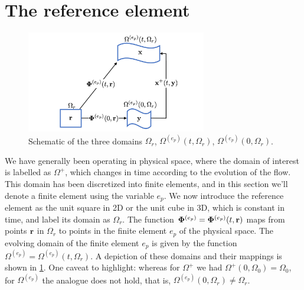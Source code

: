 \documentclass[11pt]{report}
\begin{document}
\section{The reference element}
\begin{figure}[ht]
    \centering
    \includegraphics[width=0.7\textwidth]{../../images/three_spaces.pdf}
    \caption{Schematic of the three domains $\Omega_r$, $\Omega^{(e_p)}(t,\Omega_r)$, $\Omega^{(e_p)}(0,\Omega_r)$.}
    \label{fig:three_spaces}
 \end{figure}
We have generally been operating in physical space, where the domain of interest is labelled as $\Omega^+$, which changes in time according to the evolution of the flow. This domain has been discretized into finite elements, and in this section we'll denote a finite element using the variable $e_p$. We now introduce the reference element as the unit square in 2D or the unit cube in 3D, which is constant in time, and label its domain as $\Omega_r$. The function $\bm \Phi^{(e_p)} = \bm \Phi^{(e_p)}(t,\mathbf{r})$ maps from points $\mathbf{r}$ in $\Omega_r$ to points in the finite element $e_p$ of the physical space. The evolving domain of the finite element $e_p$ is given  by the function $\Omega^{(e_p)} = \Omega^{(e_p)}(t,\Omega_r)$. A depiction of these domains and their mappings is shown in \cref{fig:three_spaces}. One caveat to highlight: whereas for $\Omega^+$ we had $\Omega^+(0,\Omega_0)=\Omega_0$, for $\Omega^{(e_p)}$ the analogue does not hold, that is, $\Omega^{(e_p)}(0,\Omega_r) \ne \Omega_r$.
\end{document}
